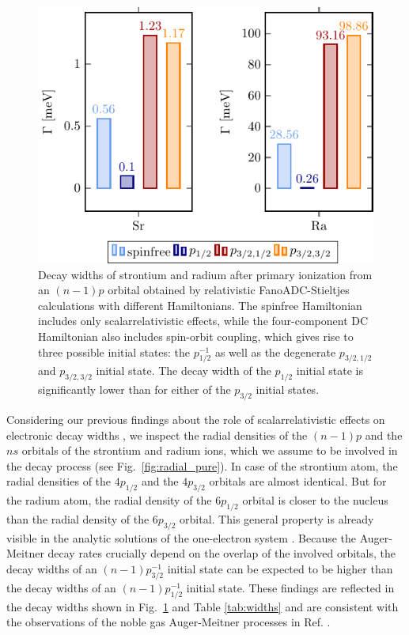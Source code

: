 \begin{figure}[h]
 \centering
 \includegraphics[width=0.95\columnwidth]{pics/gamma_group.pdf}
 \caption{Decay widths of strontium and radium after primary ionization from
          an $(n-1)p$ orbital obtained by relativistic FanoADC-Stieltjes
          calculations with different Hamiltonians. The spinfree Hamiltonian
          includes only scalarrelativistic effects, while the four-component
          DC Hamiltonian also includes spin-orbit coupling, which gives rise to
          three possible initial states: the $p_{1/2}^{-1}$ as well as the
          degenerate $p_{3/2,1/2}$ and $p_{3/2,3/2}$ initial state.
          The decay width of the $p_{1/2}$
          initial state is significantly lower than for either of the
          $p_{3/2}$ initial
          states.}
 \label{fig:gamma}
\end{figure}

Considering our previous findings about the role
of scalarrelativistic effects on electronic decay widths \cite{Fasshauer15_1},
we inspect the radial densities of the $(n-1)p$ and the $ns$ orbitals of the
strontium and radium ions,
which we assume to be involved in the decay process (see
Fig.~\ref{fig:radial_pure}).
In case of the strontium atom, the radial densities of the $4p_{1/2}$ and the
$4p_{3/2}$ orbitals are almost identical. But for the radium atom, the radial
density of the  $6p_{1/2}$ orbital is closer to the nucleus than
the radial density of the $6p_{3/2}$ orbital. This general property is already
visible in the analytic solutions of the one-electron system \cite{Bethe_Salpeter}.
Because the Auger-Meitner decay rates crucially depend on the overlap of the
involved orbitals, the decay widths of an $(n-1)p_{3/2}^{-1}$ initial state
can be expected to be higher than the decay widths of an $(n-1)p_{1/2}^{-1}$
initial state. These findings are reflected in the decay widths shown in
Fig.~\ref{fig:gamma} and Table \ref{tab:widths} and are consistent with the
observations of the noble gas Auger-Meitner processes in Ref. \cite{Fasshauer15_1}.


